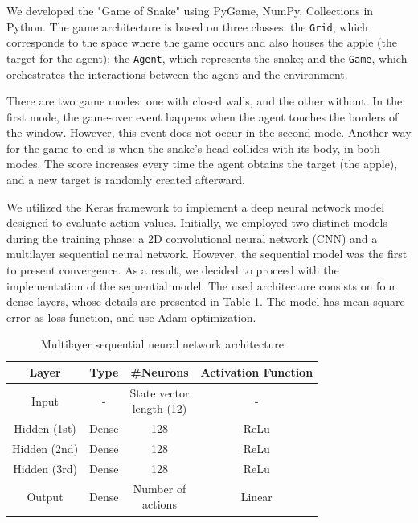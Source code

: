 \documentclass[conference]{IEEEtran}
\begin{document}
We developed the "Game of Snake" using PyGame, NumPy, Collections in Python. The game architecture is based on three classes: the \texttt{Grid}, which corresponds to the space where the game occurs and also houses the apple (the target for the agent); the \texttt{Agent}, which represents the snake; and the \texttt{Game}, which orchestrates the interactions between the agent and the environment.

There are two game modes: one with closed walls, and the other without. In the first mode, the game-over event happens when the agent touches the borders of the window. However, this event does not occur in the second mode. Another way for the game to end is when the snake's head collides with its body, in both modes. The score increases every time the agent obtains the target (the apple), and a new target is randomly created afterward.

We utilized the Keras framework to implement a deep neural network model designed to evaluate action values. Initially, we employed two distinct models during the training phase: a 2D convolutional neural network (CNN) and a multilayer sequential neural network. However, the sequential model was the first to present convergence. As a result, we decided to proceed with the implementation of the sequential model. The used architecture consists on four dense layers, whose details are presented in Table \ref{tab:NNarchtecture}. The model has mean square error as loss function, and use Adam optimization.

\begin{table}[h]
    \centering
    \label{tab:NNarchtecture}
    \caption{Multilayer sequential neural network architecture}
    \begin{tabular}{cccc} 
        \toprule %
        Layer & Type & \#Neurons & Activation Function \\
        \midrule %
        Input             & -     & \makecell{State vector \\ length (12)} & - \\
        Hidden (1st) & Dense & 128                 & ReLu    \\
        Hidden (2nd) & Dense & 128                 & ReLu    \\
        Hidden (3rd) & Dense & 128                 & ReLu    \\
        Output            & Dense & \makecell{Number of \\actions}   & Linear \\
        \bottomrule %
    \end{tabular}
\end{table}
\end{document}
